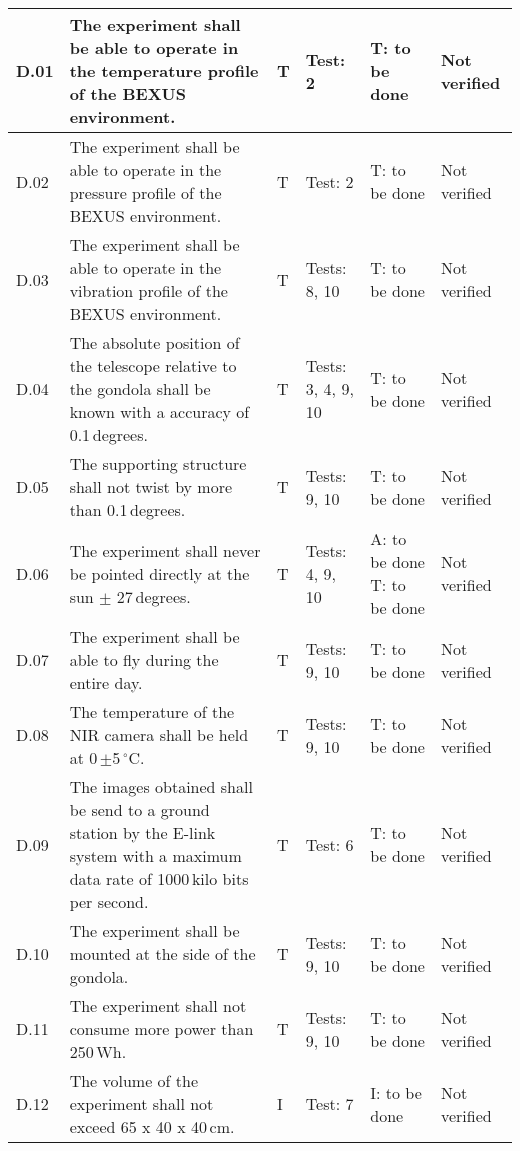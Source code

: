 \begin{longtable}[]{|m{}| m{}|m{}|m{}|m{}|m{}|}
D.01 & The experiment shall be able to operate in the temperature profile of the BEXUS environment.
& T & Test: 2 & T: to be done & Not verified \\\hline

D.02 & The experiment shall be able to operate in the pressure profile of the BEXUS environment.
& T & Test: 2  & T: to be done & Not verified \\\hline

D.03 & The experiment shall be able to operate in the vibration profile of the BEXUS environment.
& T & Tests: 8, 10 & T: to be done & Not verified \\\hline

D.04 & The absolute position of the telescope relative to the gondola shall be known with a accuracy of 0.1\,degrees.
& T & Tests: 3, 4, 9, 10 & T: to be done & Not verified \\\hline

D.05 & The supporting structure shall not twist by more than 0.1\,degrees.
& T & Tests: 9, 10 & T: to be done & Not verified \\\hline

D.06 & The experiment shall never be pointed directly at the sun $\pm$ 27\,degrees.
& T & Tests: 4, 9, 10 & A: to be done \newline T: to be done & Not verified \\\hline

D.07 & The experiment shall be able to fly during the entire day.
& T & Tests: 9, 10 & T: to be done & Not verified \\\hline

D.08 & The temperature of the NIR camera shall be held at 0\,$\pm$5\,$^\circ$C.
& T & Tests: 9, 10 & T: to be done & Not verified \\\hline

D.09 & The images obtained shall be send to a ground station by the E-link system with a maximum data rate of 1000\,kilo bits per second.
& T & Test: 6 & T: to be done & Not verified \\\hline

D.10 & The experiment shall be mounted at the side of the gondola.
& T & Tests: 9, 10 & T: to be done & Not verified \\\hline

D.11 & The experiment shall not consume more power than 250\,Wh.
& T & Tests: 9, 10 & T: to be done & Not verified \\\hline

D.12 & The volume of the experiment shall not exceed 65 x 40 x 40\,cm.
& I & Test: 7 & I: to be done & Not verified \\\hline


\end{longtable}
